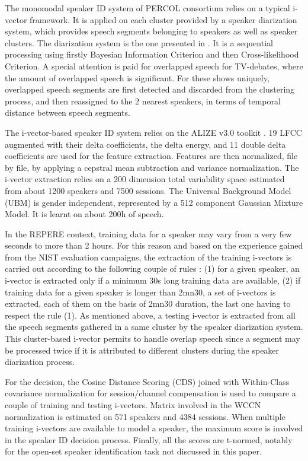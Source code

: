 The monomodal speaker ID system of PERCOL consortium relies on a typical i-vector framework. It is applied on each cluster provided by a speaker diarization system, which provides speech segments belonging to speakers as well as speaker clusters.
The diarization system is the one presented in \cite{charlet2013}. It is a sequential processing using firstly Bayesian Information Criterion and then Cross-likelihood Criterion. A special attention is paid for overlapped speech for TV-debates, where the amount of overlapped speech is significant. For these shows uniquely, overlapped speech segments are first detected and discarded from the clustering process, and then reassigned to the 2 nearest speakers, in terms of temporal distance between speech segments.

The i-vector-based speaker ID system relies on the ALIZE v3.0 toolkit \cite{larcher2013}. 19 LFCC augmented with their delta coefficients, the delta energy, and 11 double delta coefficients are used for the feature extraction. Features are then normalized, file by file, by applying a cepstral mean subtraction and variance normalization. The i-vector extraction relies on a 200 dimension total variability space estimated from about 1200 speakers and 7500 sessions. The Universal Background Model (UBM) is gender independent, represented by a 512 component Gaussian Mixture Model. It is learnt on about 200h of speech.

In the REPERE context, training data for a speaker may vary from a very few seconds to more than 2 hours. For this reason and based on the experience gained from the NIST evaluation campaigns, the extraction of the training i-vectors is carried out according to the following couple of rules : (1) for a given speaker, an i-vector is extracted only if a minimum 30s long training data are available, (2) if training data for a given speaker is longer than 2mn30, a set of i-vectors is extracted, each of them on the basis of 2mn30 duration, the last one having to respect the rule (1).
As mentioned above, a testing i-vector is extracted from all the speech segments gathered in a same cluster by the speaker diarization system. This cluster-based i-vector permits to handle overlap speech since a segment may be processed twice if it is attributed to different clusters during the speaker diarization process.

For the decision, the Cosine Distance Scoring (CDS) joined  with Within-Class covariance normalization for session/channel compensation is used to compare a couple of training and testing i-vectors. Matrix involved in the WCCN normalization is estimated on 571 speakers and 4384 sessions. When multiple training i-vectors are available to model a speaker, the maximum score is involved in the speaker ID decision process. Finally, all the scores are t-normed, notably for the open-set speaker identification task not discussed in this paper.


